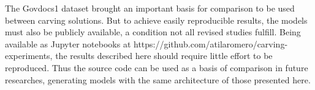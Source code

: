 The Govdocs1 dataset brought an important basis for comparison to be used between carving solutions. But to achieve easily reproducible results, the models must also be publicly available, a condition not all revised studies fulfill. Being available as Jupyter notebooks at https://github.com/atilaromero/carving-experiments, the results described here should require little effort to be reproduced. Thus the source code can be used as a basis of comparison in future researches, generating models with the same architecture of those presented here.
